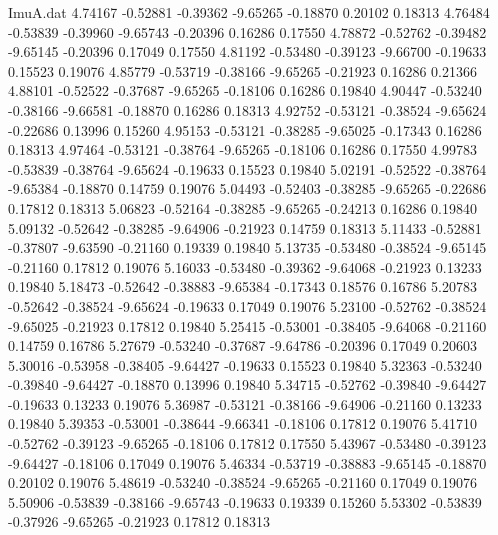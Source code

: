 \begin{filecontents}{ImuA.dat}
   4.74167   -0.52881   -0.39362   -9.65265   -0.18870    0.20102    0.18313
   4.76484   -0.53839   -0.39960   -9.65743   -0.20396    0.16286    0.17550
   4.78872   -0.52762   -0.39482   -9.65145   -0.20396    0.17049    0.17550
   4.81192   -0.53480   -0.39123   -9.66700   -0.19633    0.15523    0.19076
   4.85779   -0.53719   -0.38166   -9.65265   -0.21923    0.16286    0.21366
   4.88101   -0.52522   -0.37687   -9.65265   -0.18106    0.16286    0.19840
   4.90447   -0.53240   -0.38166   -9.66581   -0.18870    0.16286    0.18313
   4.92752   -0.53121   -0.38524   -9.65624   -0.22686    0.13996    0.15260
   4.95153   -0.53121   -0.38285   -9.65025   -0.17343    0.16286    0.18313
   4.97464   -0.53121   -0.38764   -9.65265   -0.18106    0.16286    0.17550
   4.99783   -0.53839   -0.38764   -9.65624   -0.19633    0.15523    0.19840
   5.02191   -0.52522   -0.38764   -9.65384   -0.18870    0.14759    0.19076
   5.04493   -0.52403   -0.38285   -9.65265   -0.22686    0.17812    0.18313
   5.06823   -0.52164   -0.38285   -9.65265   -0.24213    0.16286    0.19840
   5.09132   -0.52642   -0.38285   -9.64906   -0.21923    0.14759    0.18313
   5.11433   -0.52881   -0.37807   -9.63590   -0.21160    0.19339    0.19840
   5.13735   -0.53480   -0.38524   -9.65145   -0.21160    0.17812    0.19076
   5.16033   -0.53480   -0.39362   -9.64068   -0.21923    0.13233    0.19840
   5.18473   -0.52642   -0.38883   -9.65384   -0.17343    0.18576    0.16786
   5.20783   -0.52642   -0.38524   -9.65624   -0.19633    0.17049    0.19076
   5.23100   -0.52762   -0.38524   -9.65025   -0.21923    0.17812    0.19840
   5.25415   -0.53001   -0.38405   -9.64068   -0.21160    0.14759    0.16786
   5.27679   -0.53240   -0.37687   -9.64786   -0.20396    0.17049    0.20603
   5.30016   -0.53958   -0.38405   -9.64427   -0.19633    0.15523    0.19840
   5.32363   -0.53240   -0.39840   -9.64427   -0.18870    0.13996    0.19840
   5.34715   -0.52762   -0.39840   -9.64427   -0.19633    0.13233    0.19076
   5.36987   -0.53121   -0.38166   -9.64906   -0.21160    0.13233    0.19840
   5.39353   -0.53001   -0.38644   -9.66341   -0.18106    0.17812    0.19076
   5.41710   -0.52762   -0.39123   -9.65265   -0.18106    0.17812    0.17550
   5.43967   -0.53480   -0.39123   -9.64427   -0.18106    0.17049    0.19076
   5.46334   -0.53719   -0.38883   -9.65145   -0.18870    0.20102    0.19076
   5.48619   -0.53240   -0.38524   -9.65265   -0.21160    0.17049    0.19076
   5.50906   -0.53839   -0.38166   -9.65743   -0.19633    0.19339    0.15260
   5.53302   -0.53839   -0.37926   -9.65265   -0.21923    0.17812    0.18313

\end{filecontents}
